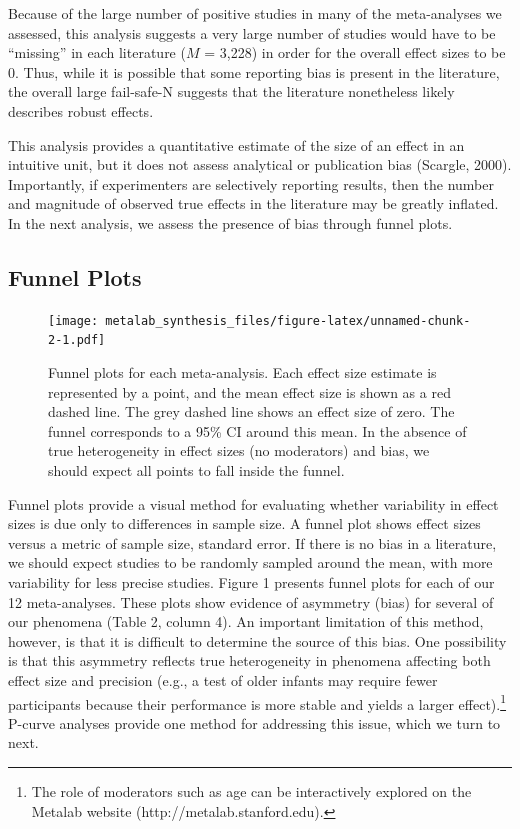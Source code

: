 \documentclass[english,floatsintext,man]{apa6}
\theoremstyle{definition}
\theoremstyle{definition}
\theoremstyle{remark}
\begin{document}
Because of the large number of positive studies in many of the
meta-analyses we assessed, this analysis suggests a very large number of
studies would have to be \enquote{missing} in each literature (\(M\) =
3,228) in order for the overall effect sizes to be 0. Thus, while it is
possible that some reporting bias is present in the literature, the
overall large fail-safe-N suggests that the literature nonetheless
likely describes robust effects.

This analysis provides a quantitative estimate of the size of an effect
in an intuitive unit, but it does not assess analytical or publication
bias (Scargle, 2000). Importantly, if experimenters are selectively
reporting results, then the number and magnitude of observed true
effects in the literature may be greatly inflated. In the next analysis,
we assess the presence of bias through funnel plots.

\subsection{Funnel Plots}\label{funnel-plots}

\begin{figure}
\centering
\texttt{[image: metalab\_synthesis\_files/figure-latex/unnamed-chunk-2-1.pdf]}
\caption{\label{fig:unnamed-chunk-2}Funnel plots for each meta-analysis.
Each effect size estimate is represented by a point, and the mean effect
size is shown as a red dashed line. The grey dashed line shows an effect
size of zero. The funnel corresponds to a 95\% CI around this mean. In
the absence of true heterogeneity in effect sizes (no moderators) and
bias, we should expect all points to fall inside the funnel.}
\end{figure}

Funnel plots provide a visual method for evaluating whether variability
in effect sizes is due only to differences in sample size. A funnel plot
shows effect sizes versus a metric of sample size, standard error. If
there is no bias in a literature, we should expect studies to be
randomly sampled around the mean, with more variability for less precise
studies. Figure 1 presents funnel plots for each of our 12
meta-analyses. These plots show evidence of asymmetry (bias) for several
of our phenomena (Table 2, column 4). An important limitation of this
method, however, is that it is difficult to determine the source of this
bias. One possibility is that this asymmetry reflects true heterogeneity
in phenomena affecting both effect size and precision (e.g., a test of
older infants may require fewer participants because their performance
is more stable and yields a larger
effect).\footnote{The role of moderators such as age can be interactively explored on the Metalab website (http://metalab.stanford.edu).}
P-curve analyses provide one method for addressing this issue, which we
turn to next.
\end{document}
